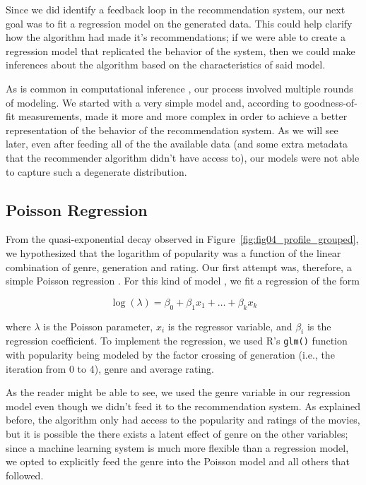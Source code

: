 Since we did identify a feedback loop in the recommendation system, our next
goal was to fit a regression model on the generated data. This could help
clarify how the algorithm had made it's recommendations; if we were able to
create a regression model that replicated the behavior of the system, then we
could make inferences about the algorithm based on the characteristics of said
model.


As is common in computational inference \citep{}, our process involved multiple
rounds of modeling. We started with a very simple model and, according to
goodness-of-fit measurements, made it more and more complex in order to achieve
a better representation of the behavior of the recommendation system. As we will
see later, even after feeding all of the the available data (and some extra
metadata that the recommender algorithm didn't have access to), our models were
not able to capture such a degenerate distribution.

\subsection{Poisson Regression}
\label{subsec:poisson04}

From the quasi-exponential decay observed in
Figure~\ref{fig:fig04_profile_grouped}, we hypothesized that the logarithm of
popularity was a function of the linear combination of genre, generation and
rating. Our first attempt was, therefore, a simple Poisson regression \citep{}.
For this kind of model \citep{}, we fit a regression of the form


$$
\log(\lambda) = \beta_0 + \beta_1 x_1 + \dots + \beta_k x_k
$$

\noindent where $\lambda$ is the Poisson parameter, $x_i$ is the regressor
variable, and $\beta_i$ is the regression coefficient. To implement the
regression, we used R's \verb|glm()| \citep{} function with popularity being
modeled by the factor crossing of generation (i.e., the iteration from 0 to 4),
genre and average rating.

As the reader might be able to see, we used the genre variable in our regression
model even though we didn't feed it to the recommendation system. As explained
before, the algorithm only had access to the popularity and ratings of the
movies, but it is possible the there exists a latent effect of genre on the
other variables; since a machine learning system is much more flexible than a
regression model, we opted to explicitly feed the genre into the Poisson model
and all others that followed.

